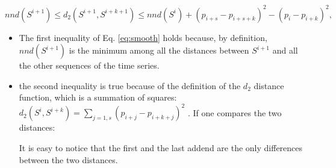 \documentclass[a4paper,twoside]{article}
\begin{document}
\begin{strip}
 \begin{equation}\label{eq:smooth}
 nnd(S^{i+1}) \leq d_2(S^{i+1}, S^{i+k+1}) \leq nnd (S^i)+ (p_{i+s} - p_{i+s+k})^2 - (p_i-p_{i+k})^2,
 \end{equation}
 \end{strip}
 \begin{itemize}
\item The first inequality of Eq. \ref{eq:smooth} holds because, by definition, $nnd(S^{i+1})$ is the minimum among all the distances between $S^{i+1}$ and all the other sequences of the time series.
\item the second inequality is true because of the definition of the $d_2$ distance function, which is a summation of squares: $d_2(S^i,S^{i+k})= \sum_{j=1,s} (p_{i+j}-p_{i+k+j})^2$ 
%
. If one compares the two distances:\\
%
%
%
\begin{strip}
\end{strip}
It is easy to notice that the first and the last addend are the only differences between the two distances.
\end{itemize}
\end{document}
